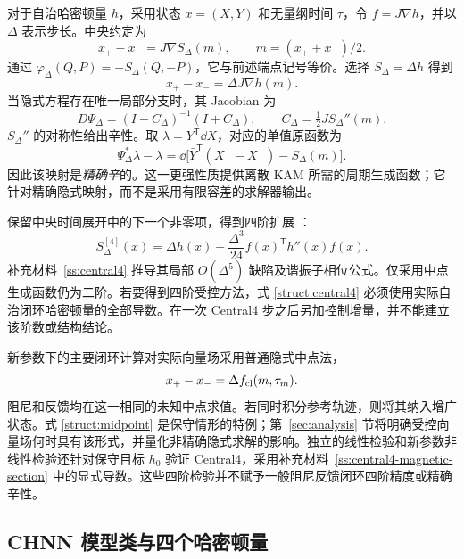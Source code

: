 对于自治哈密顿量 $h$，采用状态 $x=(X,Y)$ 和无量纲时间 $\tau$，令 $f=J\nabla h$，并以 $\Delta$ 表示步长。中央约定为
\begin{equation}\label{struct:central-map}
 x_+-x_-=J\nabla S_\Delta(m),\qquad m=(x_++x_-)/2.
\end{equation}
通过 $\varphi_\Delta(Q,P)=-S_\Delta(Q,-P)$，它与前述端点记号等价。选择 $S_\Delta=\Delta h$ 得到
\begin{equation}\label{struct:midpoint}
 x_+-x_-=\Delta J\nabla h(m).
\end{equation}
当隐式方程存在唯一局部分支时，其 Jacobian 为
\begin{equation}\label{struct:cayley}
 D\Psi_\Delta=(I-C_\Delta)^{-1}(I+C_\Delta),\qquad
 C_\Delta=\tfrac12J S_\Delta''(m).
\end{equation}
$S_\Delta''$ 的对称性给出辛性。取 $\lambda=Y^{\mathsf T}\dd X$，对应的单值原函数为
\begin{equation}\label{struct:exact-symplectic}
 \Psi_\Delta^*\lambda-\lambda
 =\dd\bigl[\bar Y^{\mathsf T}(X_+-X_-)-S_\Delta(m)\bigr].
\end{equation}
因此该映射是\emph{精确辛}的。这一更强性质提供离散 KAM 所需的周期生成函数；它针对精确隐式映射，而不是采用有限容差的求解器输出。

保留中央时间展开中的下一个非零项，得到四阶扩展 \citep{feng}：
\begin{equation}\label{struct:central4}
 S_\Delta^{[4]}(x)=\Delta h(x)
       +\frac{\Delta^3}{24}f(x)^{\mathsf T}h''(x)f(x).
\end{equation}
补充材料~\ref{ss:central4} 推导其局部 $O(\Delta^5)$ 缺陷及谐振子相位公式。仅采用中点生成函数仍为二阶。若要得到四阶受控方法，式 \eqref{struct:central4} 必须使用实际自治闭环哈密顿量的全部导数。在一次 Central4 步之后另加控制增量，并不能建立该阶数或结构结论。

新参数下的主要闭环计算对实际向量场采用普通隐式中点法，
\begin{equation}\label{struct:general-midpoint}
 x_+-x_-=\Delta f_{\rm cl}(m,\tau_m).
\end{equation}
阻尼和反馈均在这一相同的未知中点求值。若同时积分参考轨迹，则将其纳入增广状态。式 \eqref{struct:midpoint} 是保守情形的特例；第~\ref{sec:analysis} 节将明确受控向量场何时具有该形式，并量化非精确隐式求解的影响。独立的线性检验和新参数非线性检验还针对保守目标 $h_0$ 验证 Central4，采用补充材料~\ref{ss:central4-magnetic-section} 中的显式导数。这些四阶检验并不赋予一般阻尼反馈闭环四阶精度或精确辛性。

\subsection{CHNN 模型类与四个哈密顿量}
\label{struct:objects-section}

